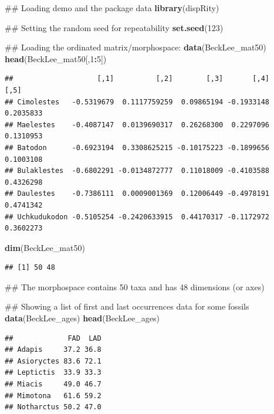 \documentclass[]{book}
\newenvironment{Shaded}{\begin{snugshade}}{\end{snugshade}}
\newcommand{\KeywordTok}[1]{\textcolor[rgb]{0.13,0.29,0.53}{\textbf{#1}}}
\newcommand{\DecValTok}[1]{\textcolor[rgb]{0.00,0.00,0.81}{#1}}
\newcommand{\OperatorTok}[1]{\textcolor[rgb]{0.81,0.36,0.00}{\textbf{#1}}}
\newcommand{\NormalTok}[1]{#1}
\theoremstyle{definition}
\theoremstyle{definition}
\theoremstyle{remark}
\begin{document}
\begin{Shaded}
\begin{Highlighting}[]
\NormalTok{## Loading demo and the package data}
\KeywordTok{library}\NormalTok{(dispRity)}

\NormalTok{## Setting the random seed for repeatability}
\KeywordTok{set.seed}\NormalTok{(}\DecValTok{123}\NormalTok{)}

\NormalTok{## Loading the ordinated matrix/morphospace:}
\KeywordTok{data}\NormalTok{(BeckLee_mat50)}
\KeywordTok{head}\NormalTok{(BeckLee_mat50[,}\DecValTok{1}\OperatorTok{:}\DecValTok{5}\NormalTok{])}
\end{Highlighting}
\end{Shaded}

\begin{verbatim}
##                    [,1]          [,2]        [,3]       [,4]      [,5]
## Cimolestes   -0.5319679  0.1117759259  0.09865194 -0.1933148 0.2035833
## Maelestes    -0.4087147  0.0139690317  0.26268300  0.2297096 0.1310953
## Batodon      -0.6923194  0.3308625215 -0.10175223 -0.1899656 0.1003108
## Bulaklestes  -0.6802291 -0.0134872777  0.11018009 -0.4103588 0.4326298
## Daulestes    -0.7386111  0.0009001369  0.12006449 -0.4978191 0.4741342
## Uchkudukodon -0.5105254 -0.2420633915  0.44170317 -0.1172972 0.3602273
\end{verbatim}

\begin{Shaded}
\begin{Highlighting}[]
\KeywordTok{dim}\NormalTok{(BeckLee_mat50)}
\end{Highlighting}
\end{Shaded}

\begin{verbatim}
## [1] 50 48
\end{verbatim}

\begin{Shaded}
\begin{Highlighting}[]
\NormalTok{## The morphospace contains 50 taxa and has 48 dimensions (or axes)}

\NormalTok{## Showing a list of first and last occurrences data for some fossils}
\KeywordTok{data}\NormalTok{(BeckLee_ages)}
\KeywordTok{head}\NormalTok{(BeckLee_ages)}
\end{Highlighting}
\end{Shaded}

\begin{verbatim}
##             FAD  LAD
## Adapis     37.2 36.8
## Asioryctes 83.6 72.1
## Leptictis  33.9 33.3
## Miacis     49.0 46.7
## Mimotona   61.6 59.2
## Notharctus 50.2 47.0
\end{verbatim}
\end{document}
